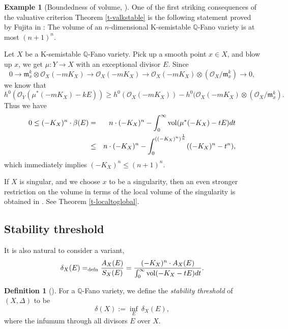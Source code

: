 \documentclass[12pt,reqno]{amsart}%
\theoremstyle{definition}
\newtheorem{defn}[thm]{Definition}
\newtheorem{exmp}[thm]{Example}
\theoremstyle{remark}
\newcommand{\vol}{{\rm vol}}
\newcommand{\fm}{{\mathfrak{m}}}
\begin{document}
\begin{exmp}[Boundedness of volume, {\cite{Fuj18}}]\label{e-bounded} 
One of the first striking consequences of the valuative criterion Theorem \ref{t-valkstable} is the following statement proved by Fujita in \cite{Fuj18}: The volume of an $n$-dimensional K-semistable $\mathbb{Q}$-Fano variety is at most $(n+1)^n$. 

Let $X$ be a K-semistable $\mathbb{Q}$-Fano variety. Pick up a smooth point $x\in X$, and blow up $x$, we get $\mu\colon Y\to X$ with an exceptional divisor $E$. 
Since 
\[
0\to \fm_x^k\otimes \mathcal{O}_X(-mK_X)\to \mathcal{O}_X(-mK_X) \to  \mathcal{O}_X(-mK_X)\otimes (\mathcal{O}_X/ \fm_x^k)\to 0,
\]
we know that 
$$h^0(\mathcal{O}_Y(\mu^*(-mK_X)-kE))\ge h^0(\mathcal{O}_X(-mK_X))-h^0(\mathcal{O}_X(-mK_X)\otimes (\mathcal{O}_X/ \fm_x^k).$$
Thus we have
\begin{eqnarray*}
0\le (-K_X)^n\cdot\beta(E)&=&n\cdot (-K_X)^n-\int^{\infty}_{0}\vol(\mu^*(-K_X)-tE)dt\\
&\le &n\cdot (-K_X)^n-\int^{((-K_X)^n)^{\frac1n}}_{0}((-K_X)^n-t^n),
\end{eqnarray*}
which immediately implies $(-K_X)^n\le (n+1)^n. $

If $X$ is singular, and we choose $x$ to be a singularity, then an even stronger restriction on the volume in terms of the local volume of the singularity  is obtained in \cite{Liu18}. See Theorem \ref{t-localtoglobal}. 
\end{exmp}



\subsection{Stability threshold}\label{sss-delta}
It is also natural to consider a variant, 
$$
\delta_X(E)=_{\rm defn}\frac{A_X(E)}{S_X(E)}=\frac{(-K_X)^n \cdot A_{X}(E)}{ \int^{\infty}_{0}\vol(-K_X-tE)dt}.
$$

\begin{defn}[{\cite{FO18,BJ20}}]\label{d-delta}
For a $\mathbb{Q}$-Fano variety, we define the \emph{stability threshold} of $(X,\Delta)$ to be
$$ \delta(X):=\inf_E \ \delta_X(E),$$
where the infumum through all divisors $E$ over $X$.
\end{defn}
\end{document}
